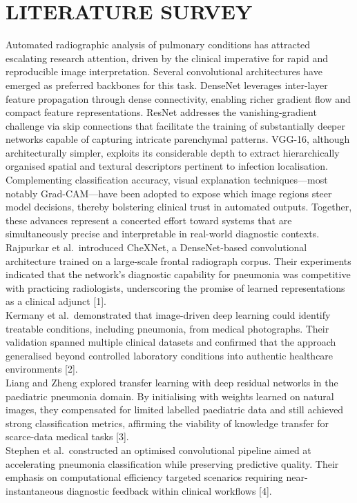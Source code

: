 \documentclass[conference]{IEEEtran}
\begin{document}
\section{\textbf{LITERATURE SURVEY}}
\hspace{0.5cm}Automated radiographic analysis of pulmonary conditions has attracted escalating research attention, driven by the clinical imperative for rapid and reproducible image interpretation. Several convolutional architectures have emerged as preferred backbones for this task. DenseNet leverages inter-layer feature propagation through dense connectivity, enabling richer gradient flow and compact feature representations. ResNet addresses the vanishing-gradient challenge via skip connections that facilitate the training of substantially deeper networks capable of capturing intricate parenchymal patterns. VGG-16, although architecturally simpler, exploits its considerable depth to extract hierarchically organised spatial and textural descriptors pertinent to infection localisation. Complementing classification accuracy, visual explanation techniques—most notably Grad-CAM—have been adopted to expose which image regions steer model decisions, thereby bolstering clinical trust in automated outputs. Together, these advances represent a concerted effort toward systems that are simultaneously precise and interpretable in real-world diagnostic contexts.\\
Rajpurkar et al.\ introduced CheXNet, a DenseNet-based convolutional architecture trained on a large-scale frontal radiograph corpus. Their experiments indicated that the network's diagnostic capability for pneumonia was competitive with practicing radiologists, underscoring the promise of learned representations as a clinical adjunct [1].\\
Kermany et al.\ demonstrated that image-driven deep learning could identify treatable conditions, including pneumonia, from medical photographs. Their validation spanned multiple clinical datasets and confirmed that the approach generalised beyond controlled laboratory conditions into authentic healthcare environments [2].\\
Liang and Zheng explored transfer learning with deep residual networks in the paediatric pneumonia domain. By initialising with weights learned on natural images, they compensated for limited labelled paediatric data and still achieved strong classification metrics, affirming the viability of knowledge transfer for scarce-data medical tasks [3].\\
Stephen et al.\ constructed an optimised convolutional pipeline aimed at accelerating pneumonia classification while preserving predictive quality. Their emphasis on computational efficiency targeted scenarios requiring near-instantaneous diagnostic feedback within clinical workflows [4].\\
\end{document}
